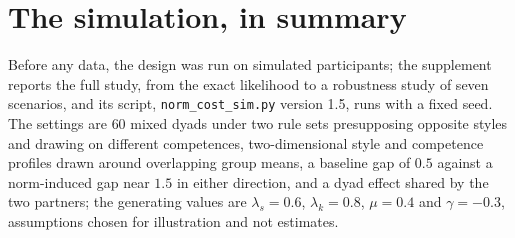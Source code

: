 \section{The simulation, in summary}
\label{sec:simulation}

Before any data, the design was run on simulated participants; the supplement reports the full study, from the exact likelihood to a robustness study of seven scenarios, and its script, \texttt{norm\_cost\_sim.py} version 1.5, runs with a fixed seed. The settings are $60$ mixed dyads under two rule sets presupposing opposite styles and drawing on different competences, two-dimensional style and competence profiles drawn around overlapping group means, a baseline gap of $0.5$ against a norm-induced gap near $1.5$ in either direction, and a dyad effect shared by the two partners; the generating values are $\lambda_s = 0.6$, $\lambda_k = 0.8$, $\mu = 0.4$ and $\gamma = -0.3$, assumptions chosen for illustration and not estimates.

